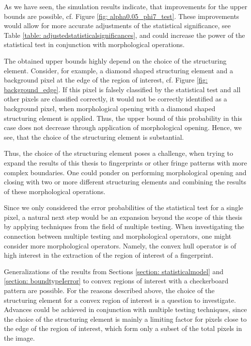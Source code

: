 \documentclass[a4paper,12pt]{article}
\theoremstyle{plain}
\theoremstyle{definition}
\numberwithin{equation}{section}
\begin{document}
As we have seen, the simulation results indicate, that improvements for the upper bounds are possible, cf. Figure \ref{fig: alpha0.05_phi7_test}. These improvements would allow for more accurate adjustments of the statistical significance, see Table \ref{table: adjustedstatisticalsignificances}, and could increase the power of the statistical test in conjunction with morphological operations.

The obtained upper bounds highly depend on the choice of the structuring element. Consider, for example, a diamond shaped structuring element and a background pixel at the edge of the region of interest, cf. Figure \ref{fig: background_edge}. If this pixel is falsely classified by the statistical test and all other pixels are classified correctly, it would not be correctly identified as a background pixel, when morphological opening with a diamond shaped structuring element is applied. Thus, the upper bound of this probability in this case does not decrease through application of morphological opening. Hence, we see, that the choice of the structuring element is substantial.

Thus, the choice of the structuring element poses a challenge, when trying to expand the results of this thesis to fingerprints or other fringe patterns with more complex boundaries. One could ponder on performing morphological opening and closing with two or more different structuring elements and combining the results of these morphological operations.

Since we only considered the error probabilities of the statistical test for a single pixel, a natural next step would be an expansion beyond the scope of this thesis by applying techniques from the field of multiple testing. When investigating the connection between multiple testing and morphological operators, one might consider more morphological operators. Namely, the convex hull operator is of high interest in the extraction of the region of interest of a fingerprint.

Generalizations of the results from Sections \ref{section: statisticalmodel} and \ref{section: boundtypeIerror} to convex regions of interest with a checkerboard pattern are possible. For the reasons described above, the choice of the structuring element for a convex region of interest is a question to investigate. Advances could be achieved in conjunction with multiple testing techniques, since the choice of the structuring element is mainly a limiting factor for pixels close to the edge of the region of interest, which form only a subset of the total pixels in the image.
\end{document}
